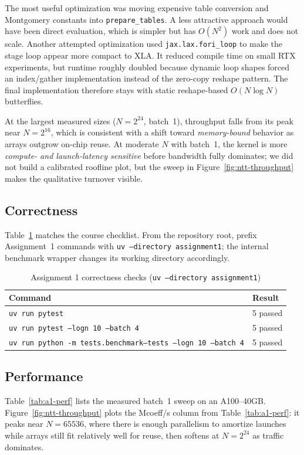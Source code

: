 \documentclass[conference]{IEEEtran}
\begin{document}
The most useful optimization was moving expensive table conversion and
Montgomery constants into \texttt{prepare\_tables}. A less attractive approach
would have been direct evaluation, which is simpler but has $O(N^2)$ work and
does not scale. Another attempted optimization used \texttt{jax.lax.fori\_loop}
to make the stage loop appear more compact to XLA. It reduced compile time on
small RTX experiments, but runtime roughly doubled because dynamic loop shapes
forced an index/gather implementation instead of the zero-copy reshape pattern.
The final implementation therefore stays with static reshape-based
$O(N\log N)$ butterflies.

At the largest measured sizes ($N=2^{24}$, batch~1), throughput falls from its
peak near $N=2^{16}$, which is consistent with a shift toward \emph{memory-bound}
behavior as arrays outgrow on-chip reuse. At moderate $N$ with batch~1, the
kernel is more \emph{compute- and launch-latency sensitive} before bandwidth
fully dominates; we did not build a calibrated roofline plot, but the sweep in
Figure~\ref{fig:ntt-throughput} makes the qualitative turnover visible.

\subsection{Correctness}
Table~\ref{tab:a1-correctness} matches the course checklist. From the
repository root, prefix Assignment~1 commands with
\texttt{uv --directory assignment1}; the internal benchmark wrapper changes its
working directory accordingly.

\begin{table}[htbp]
\caption{Assignment 1 correctness checks (\texttt{uv --directory assignment1})}
\label{tab:a1-correctness}
\centering
\footnotesize
\setlength{\tabcolsep}{4pt}
\begin{tabularx}{\columnwidth}{@{}>{\raggedright\arraybackslash}X l@{}}
\toprule
Command & Result \\
\midrule
\texttt{uv run pytest} & 5 passed \\
\texttt{uv run pytest --logn 10 --batch 4} & 5 passed \\
\texttt{uv run python -m tests.benchmark}\newline\texttt{--tests --logn 10 --batch 4} & 5 passed \\
\bottomrule
\end{tabularx}
\end{table}

\subsection{Performance}
Table~\ref{tab:a1-perf} lists the measured batch~1 sweep on an A100--40GB.
Figure~\ref{fig:ntt-throughput} plots the Mcoeff/s column from
Table~\ref{tab:a1-perf}: it peaks near $N=65536$, where there is enough
parallelism to amortize launches while arrays still fit relatively well for
reuse, then softens at $N=2^{24}$ as traffic dominates.
\end{document}
